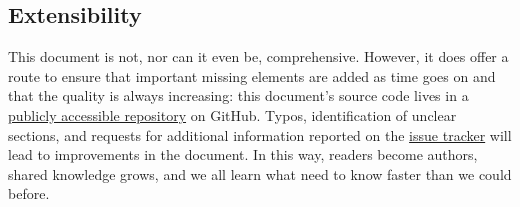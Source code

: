 \documentclass[twocolumn]{article}
\begin{document}
\subsection{Extensibility}

This document is not, nor can it even be, comprehensive.
However, it does offer a route to ensure that important missing elements are added as time goes on and that the quality is always increasing: this document's source code lives in a \href{https://github.com/danielsank/theory}{publicly accessible repository} on GitHub.
Typos, identification of unclear sections, and requests for additional information reported on the \href{https://github.com/danielsank/theory/issues}{issue tracker} will lead to improvements in the document.
In this way, readers become authors, shared knowledge grows, and we all learn what need to know faster than we could before.





\end{document}
